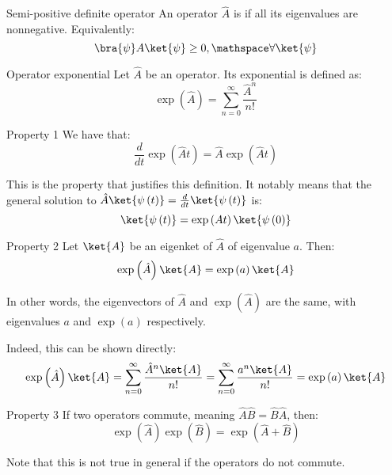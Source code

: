 \documentclass[a4paper]{article}
\begin{document}
\begin{parag}{Semi-positive definite operator}
    An operator $\hat{A}$ is  if all its eigenvalues are nonnegative. Equivalently: 
    \[\bra{\psi} A \ket{\psi} \geq 0, \mathspace \forall \ket{\psi}\]
\end{parag}

\begin{parag}{Operator exponential}
    Let $\hat{A}$ be an operator. Its exponential is defined as: 
    \[\exp\left(\hat{A}\right) = \sum_{n=0}^{\infty} \frac{\hat{A}^n}{n!}\]
    
    \begin{subparag}{Property 1}
        We have that: 
        \[\frac{d}{dt} \exp\left(\hat{A} t\right) = \hat{A} \exp\left(\hat{A} t\right)\]

        This is the property that justifies this definition. It notably means that the general solution to $\hat{A} \ket{\psi\left(t\right)} = \frac{d}{dt} \ket{\psi\left(t\right)}$ is: 
        \[\ket{\psi\left(t\right)} = \exp\left(At\right) \ket{\psi\left(0\right)}\]
    \end{subparag}

    \begin{subparag}{Property 2}
        Let $\ket{A}$ be an eigenket of $\hat{A}$ of eigenvalue $a$. Then: 
        \[\exp\left(\hat{A}\right)\ket{A} = \exp\left(a\right) \ket{A}\]

        In other words, the eigenvectors of $\hat{A}$ and $\exp\left(\hat{A}\right)$ are the same, with eigenvalues $a$ and $\exp\left(a\right)$ respectively.

        Indeed, this can be shown directly: 
        \[\exp\left(\hat{A}\right) \ket{A} = \sum_{n=0}^{\infty} \frac{\hat{A}^n \ket{A}}{n!} = \sum_{n=0}^{\infty} \frac{a^n \ket{A}}{n!} = \exp\left(a\right) \ket{A}\]
    \end{subparag}

    \begin{subparag}{Property 3}
        If two operators commute, meaning $\hat{A} \hat{B} = \hat{B}\hat{A}$, then: 
        \[\exp\left(\hat{A}\right) \exp\left(\hat{B}\right) = \exp\left(\hat{A} + \hat{B}\right)\]
        
        Note that this is not true in general if the operators do not commute.
    \end{subparag}
\end{parag}
\end{document}
